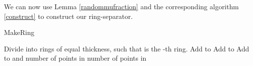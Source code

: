 \documentclass[11pt]{myclass}
\begin{document}
We can now use Lemma \ref{randommufraction} and the corresponding algorithm \ref{construct} to construct our ring-separator.

\begin{algorithm}
  \caption{MakeRing}
  \begin{algorithmic}
  \STATE {}
  	\STATE  
  	\STATE 
  	\STATE 
    \STATE 
    \STATE  
    \STATE  
    \STATE 
    \STATE Divide  into  rings of equal thickness, such that  is the -th ring.
    \STATE 
    \STATE 
    \FORALL {}
    	\IF{  }
    		\STATE 
    		\STATE 
    	\ENDIF
    \ENDFOR
    \FORALL {}
    	\IF{}
    		\STATE Add  to 
    	\ELSIF{}
    		\STATE Add  to 
    	\ELSE
    		\STATE Add  to  and 
    	\ENDIF
    \ENDFOR
    \STATE  number of points in 
    \STATE  number of points in 
    \IF {{} \OR {}} 
    	
    \ELSE	
    \ENDIF
  \end{algorithmic}
  \label{construct}
\end{algorithm}
\end{document}
